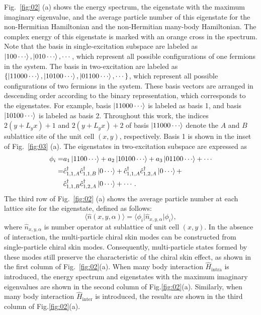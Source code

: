 \documentclass[longbibliography, aps, prx, amsmath, amssymb, amsfonts, twocolumn,superscriptaddress, footinbib]{revtex4-1}
\begin{document}
	Fig.~\ref{fig:02} (a) shows the energy spectrum, the eigenstate with the maximum imaginary eigenvalue, and the average particle number of this eigenstate for the non-Hermitian Hamiltonian and the non-Hermitian many-body Hamiltonian. The complex energy of this eigenstate is marked with an orange cross in the spectrum. 
	Note that the basis in single-excitation subspace are labeled as $\ket{100\cdots}, \ket{010\cdots}, \cdots$, which represent all possible configurations of one fermions in the system. The basis in two-excitation are labeled as $\{\ket{11000\cdots}, \ket{10100\cdots}, \ket{01100\cdots},\cdots\}$, which represent all possible configurations of two fermions in the system. These basis vectors are arranged in descending order according to the binary representation, which corresponds to the eigenstates.
	For example, basis $\ket{11000\cdots}$ is labeled as basis 1, and basis $\ket{10100\cdots}$ is labeled as basis 2. 
	Throughout this work, the indices $2(y+L_y x)+1$ and $2(y+L_y x)+2$ of basis $\ket{11000\cdots}$ denote the $A$ and $B$ sublattice site of the unit cell $(x, y)$, respectively. 
	Basis 1 is shown in the inset of Fig.~\ref{fig:03} (a). The eigenstates in two-excitation subspace are expressed as 
	\begin{equation}
		\begin{split}
			\phi_i =& a_1 \ket{1100\cdots} + a_2 \ket{10100\cdots} + a_3 \ket{01100\cdots} + \cdots\\
			=& \hat{c}_{1,1,A}^{\dagger}\hat{c}_{1,1,B}^{\dagger} \ket{0\cdots} + \hat{c}_{1,1,A}^{\dagger}\hat{c}_{1,2,A}^{\dagger} \ket{0\cdots} + \\
			&\hat{c}_{1,1,B}^{\dagger}\hat{c}_{1,2,A}^{\dagger} \ket{0\cdots} + \cdots.
		\end{split}
	\end{equation}
	The third row of Fig.~\ref{fig:02} (a) shows the average particle number at each lattice site for the eigenstate, defined as follows:
	\begin{equation}
		\langle \hat{n}(x,y,\alpha) \rangle = \langle \phi_i \vert \hat{n}_{x,y,\alpha} \vert \phi_i \rangle,
	\end{equation}
	where 
	$\hat{n}_{x,y,\alpha}$ is number operator at sublattice of unit cell $(x,y)$.
	In the absence of interaction, the multi-particle chiral skin modes can be constructed from single-particle chiral skin modes. Consequently, multi-particle states formed by these modes still preserve the characteristic of the chiral skin effect, as shown in the first column of Fig.~\ref{fig:02}(a).
	When many body interaction $\hat{H}_{\text{intra}}$ is introduced, the energy spectrum and eigenstates with the maximum imaginary eigenvalues are shown in the second column of Fig.\ref{fig:02}(a). Similarly, when many body interaction $\hat{H}_{\text{inter}}$ is introduced, the results are shown in the third column of Fig.\ref{fig:02}(a).
\end{document}
